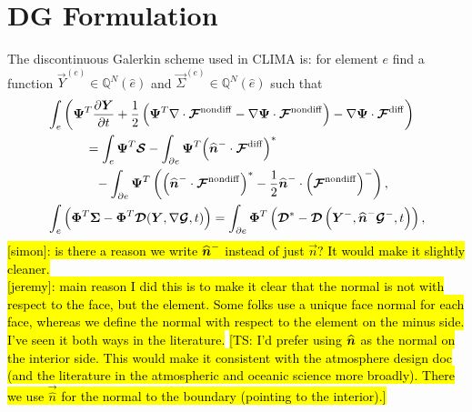 \documentclass{report}
\begin{document}
\section{DG Formulation}
The discontinuous Galerkin scheme used in CLIMA is: for element $e$ find a
function $\vec{Y}^{(e)} \in \mathbb{Q}^{N}(\hat{e})$
and $\vec{\Sigma}^{(e)} \in \mathbb{Q}^{N}(\hat{e})$
such that
\begin{align}
  &\int_{e}
  \left(
  \boldsymbol{{\Psi}}^T \frac{\partial \boldsymbol{{Y}}}{\partial t}
  + \frac{1}{2}
  \left(
  \boldsymbol{{\Psi}}^{T} \nabla \cdot \boldsymbol{{\mathcal{F}}}^{\mathrm{nondiff}}
  -
  \nabla\boldsymbol{{\Psi}} \cdot
  \boldsymbol{{\mathcal{F}}}^{\mathrm{nondiff}}
  \right)
  -
  \nabla\boldsymbol{{\Psi}} \cdot
  \boldsymbol{{\mathcal{F}}}^{\mathrm{diff}}
  \right)
  \label{eq:dg_formulation/governing_equations} \\\notag
  &\quad\quad\quad =
  \int_{e} \boldsymbol{{\Psi}}^T \boldsymbol{{\mathcal{S}}}
  -
  \int_{\partial e}
  \boldsymbol{{\Psi}}^{T}
  {\left(\widehat{\boldsymbol{{n}}}^{-} \cdot \boldsymbol{{\mathcal{F}}}^{\mathrm{diff}}\right)}^{*}
  \\\notag
  &\quad\quad\quad\phantom{=}-
  \int_{\partial e}
  \boldsymbol{{\Psi}}^{T} \left(
  {\left(\widehat{\boldsymbol{{n}}}^{-} \cdot \boldsymbol{{\mathcal{F}}}^{\mathrm{nondiff}}\right)}^{*}
  - \frac{1}{2} \widehat{\boldsymbol{{n}}}^{-} \cdot {\left(\boldsymbol{{\mathcal{F}}}^{\mathrm{nondiff}}\right)}^{-}
  \right)
  ,\\
  &\int_{e}
  \left(
  \boldsymbol{{\Phi}}^T \boldsymbol{{\Sigma}}
  -
  \boldsymbol{{\Phi}}^T \boldsymbol{{\mathcal{D}}}(\boldsymbol{{Y}}, \nabla \boldsymbol{{\mathcal{G}}}, t)
  \right)
  =
  \int_{\partial e} \boldsymbol{{\Phi}}^{T} \left(
  \boldsymbol{{\mathcal{D}}}^{*} - \boldsymbol{{\mathcal{D}}}\left(\boldsymbol{{Y}}^{-},
  \widehat{\boldsymbol{{n}}}^{-}\boldsymbol{{\mathcal{G}}}^{-}, t\right)
  \right),
  \label{eq:dg_formulation/auxiliary_equations}
\end{align}
\hl{[simon]: is there a reason we write $\widehat{\boldsymbol{{n}}}^{-}$ instead of just $\vec{n}$? It would make it slightly cleaner.}\\
\hl{[jeremy]: main reason I did this is to make it clear that the normal is not with respect to the face, but the element. Some folks use a unique face normal for each face, whereas we define the normal with respect to the element on the minus side. I've seen it both ways in the literature.}
 \hl{[TS: I'd prefer using $\widehat{\boldsymbol{{n}}}$ as the normal on the interior side. This would make it consistent with the atmosphere design doc (and the literature in the atmospheric and oceanic science more broadly). There we use $\vec{\hat n}$ for the normal to the boundary (pointing to the interior).]}
\end{document}

